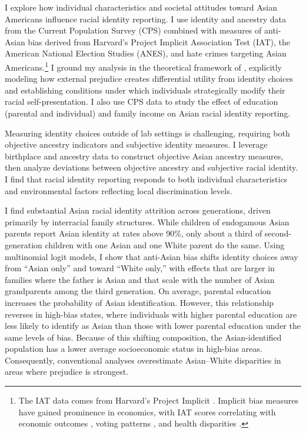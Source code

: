 I explore how individual characteristics and societal attitudes toward Asian Americans influence racial identity reporting. I use identity and ancestry data from the Current Population Survey (CPS) combined with measures of anti-Asian bias derived from Harvard's Project Implicit Association Test (IAT), the American National Election Studies (ANES), and hate crimes targeting Asian Americans.\footnote{The IAT data comes from Harvard's Project Implicit \autocite{greenwaldMeasuringIndividualDifferences1998}. Implicit bias measures have gained prominence in economics, with IAT scores correlating with economic outcomes \autocite{chettyRaceEconomicOpportunity2020,gloverDiscriminationSelfFulfillingProphecy2017}, voting patterns \autocite{friesePredictingVotingBehavior2007}, and health disparities \autocite{leitnerRacialBiasAssociated2016}.} I ground my analysis in the theoretical framework of \textcite{akerlofEconomicsIdentity2000}, explicitly modeling how external prejudice creates differential utility from identity choices and establishing conditions under which individuals strategically modify their racial self-presentation. I also use CPS data to study the effect of education (parental and individual) and family income on Asian racial identity reporting.

Measuring identity choices outside of lab settings is challenging, requiring both objective ancestry indicators and subjective identity measures. I leverage birthplace and ancestry data to construct objective Asian ancestry measures, then analyze deviations between objective ancestry and subjective racial identity. I find that racial identity reporting responds to both individual characteristics and environmental factors reflecting local discrimination levels. 

I find substantial Asian racial identity attrition across generations, driven primarily by interracial family structures. While children of endogamous Asian parents report Asian identity at rates above 90\%, only about a third of second-generation children with one Asian and one White parent do the same. Using multinomial logit models, I show that anti-Asian bias shifts identity choices away from ``Asian only'' and toward ``White only,'' with effects that are larger in families where the father is Asian and that scale with the number of Asian grandparents among the third generation. On average, parental education increases the probability of Asian identification. However, this relationship reverses in high-bias states, where individuals with higher parental education are less likely to identify as Asian than those with lower parental education under the same levels of bias. Because of this shifting composition, the Asian-identified population has a lower average socioeconomic status in high-bias areas. Consequently, conventional analyses overestimate Asian–White disparities in areas where prejudice is strongest.

